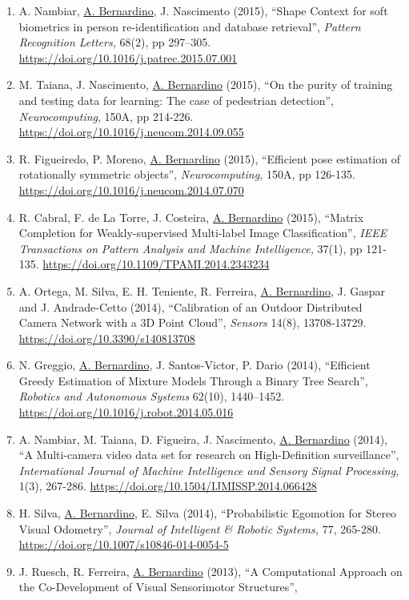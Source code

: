 \begin{enumerate}
\item
  A. Nambiar, \ul{A. Bernardino}, J. Nascimento (2015), ``Shape Context
  for soft biometrics in person re-identification and database
  retrieval'', \emph{Pattern Recognition Letters,} 68(2), pp 297--305.
  \url{https://doi.org/10.1016/j.patrec.2015.07.001}
\item
  M. Taiana, J. Nascimento, \ul{A. Bernardino} (2015), ``On the purity
  of training and testing data for learning: The case of pedestrian
  detection'', \emph{Neurocomputing}, 150A, pp 214-226.
  \url{https://doi.org/10.1016/j.neucom.2014.09.055}
\item
  R. Figueiredo, P. Moreno, \ul{A. Bernardino} (2015), ``Efficient pose
  estimation of rotationally symmetric objects'', \emph{Neurocomputing,}
  150A, pp 126-135. \url{https://doi.org/10.1016/j.neucom.2014.07.070}
\item
  R. Cabral, F. de La Torre, J. Costeira, \ul{A. Bernardino} (2015),
  ``Matrix Completion for Weakly-supervised Multi-label Image
  Classification'', \emph{IEEE Transactions on} \emph{Pattern Analysis
  and Machine Intelligence,} 37(1), pp 121-135.
  \url{https://doi.org/10.1109/TPAMI.2014.2343234}~
\item
  A. Ortega, M. Silva, E. H. Teniente, R. Ferreira, \ul{A. Bernardino},
  J. Gaspar and J. Andrade-Cetto (2014), ``Calibration of an Outdoor
  Distributed Camera Network with a 3D Point Cloud'', \emph{Sensors}
  14(8), 13708-13729. \url{https://doi.org/10.3390/s140813708}
\item
  N. Greggio, \ul{A. Bernardino}, J. Santos-Victor, P. Dario (2014),
  ``Efficient Greedy Estimation of Mixture Models Through a Binary Tree
  Search'', \emph{Robotics and Autonomous Systems} 62(10), 1440--1452.
  \url{https://doi.org/10.1016/j.robot.2014.05.016}~
\item
  A. Nambiar, M. Taiana, D. Figueira, J. Nascimento, \ul{A. Bernardino}
  (2014), ``A Multi-camera video data set for research on
  High-Definition surveillance'', \emph{International Journal of Machine
  Intelligence and Sensory Signal Processing,} 1(3), 267-286.
  \url{https://doi.org/10.1504/IJMISSP.2014.066428}
\item
  H. Silva, \ul{A. Bernardino}, E. Silva (2014), ``Probabilistic
  Egomotion for Stereo Visual Odometry'', \emph{Journal of Intelligent
  \& Robotic Systems,} 77, 265-280.
  \url{https://doi.org/10.1007/s10846-014-0054-5}
\item
  J. Ruesch, R. Ferreira, \ul{A. Bernardino} (2013), ``A Computational
  Approach on the Co-Development of Visual Sensorimotor Structures'',

\end{enumerate}
